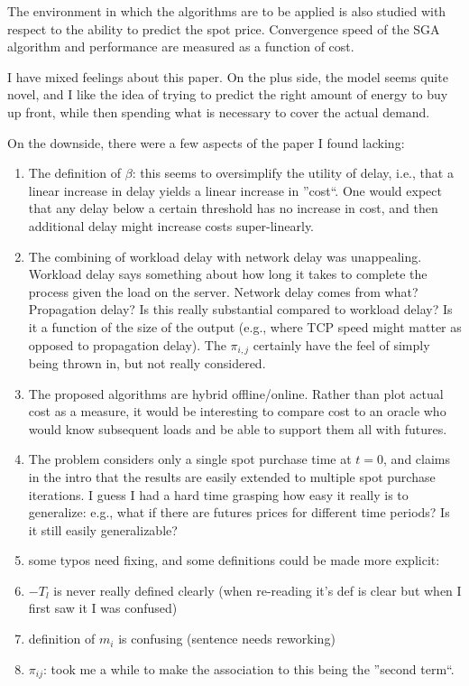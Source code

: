 The environment in which the algorithms are to be applied is also studied with respect to the ability to predict the spot price.  Convergence speed of the SGA algorithm and performance are measured as a function of cost.

I have mixed feelings about this paper.  On the plus side, the model seems quite novel, and I like the idea of trying to predict the right amount of energy to buy up front, while then spending what is necessary to cover the actual demand.  

On the downside, there were a few aspects of the paper I found lacking:

\begin{enumerate}
	\item The definition of $\beta$: this seems to oversimplify the utility of delay, i.e., that a linear increase in delay yields a linear increase in ''cost``.  One would expect that any delay below a certain threshold has no increase in cost, and then additional delay might increase costs super-linearly. 
	
	\item The combining of workload delay with network delay was unappealing.  Workload delay says something about how long it takes to complete the process given the load on the server.  Network delay comes from what?  Propagation delay?  Is this really substantial compared to workload delay?  Is it a function of the size of the output (e.g., where TCP speed might matter as opposed to propagation delay).  The $\pi_{i,j}$ certainly have the feel of simply being thrown in, but not really considered. 
	
	\item The proposed algorithms are hybrid offline/online. Rather than plot actual cost as a measure, it would be interesting to compare cost to an oracle who would know subsequent loads and be able to support them all with futures. 
	
	\item  The problem considers only a single spot purchase time at $t=0$, and claims in the intro that the results are easily extended to multiple spot purchase iterations.  I guess I had a hard time grasping how easy it really is to generalize: e.g., what if there are futures prices for different time periods?  Is it still easily generalizable? 
	
	\item  some typos need fixing, and some definitions could be made more explicit:
	\item  $-T_l$ is never really defined clearly (when re-reading it's def is clear but when I first saw it I was confused)
	\item definition of $m_i$ is confusing (sentence needs reworking)
	\item $\pi_{ij}$: took me a while to make the association to this being the ''second term``. 
\end{enumerate}

